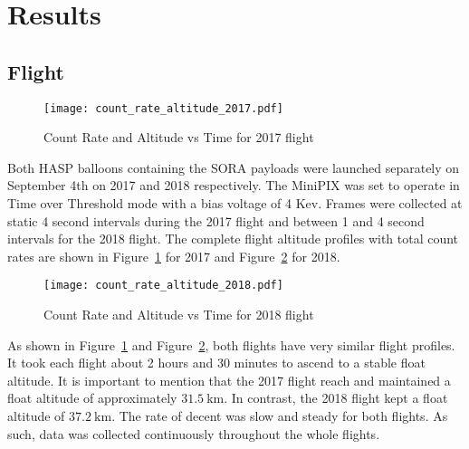 \section{Results}
\label{Results}

\subsection{Flight}

\begin{figure}[H]
\centering
\texttt{[image: count\_rate\_altitude\_2017.pdf]}
\caption{Count Rate and Altitude vs Time for 2017 flight}
\label{fig:ratealttime_2017}
\end{figure}
%

Both HASP balloons containing the SORA payloads were launched separately on September 4th on 2017 and 2018 respectively.  The MiniPIX was set to operate in Time over Threshold mode with a bias voltage of 4 Kev.  Frames were collected at static 4 second intervals during the 2017 flight and between 1 and 4 second intervals for the 2018 flight.  The complete flight altitude profiles with total count rates are shown in Figure~\ref{fig:ratealttime_2017} for 2017 and Figure~\ref{fig:ratealttime_2018} for 2018.
%
\begin{figure}[H]
\centering
\texttt{[image: count\_rate\_altitude\_2018.pdf]}
\caption{Count Rate and Altitude vs Time for 2018 flight}
\label{fig:ratealttime_2018}
\end{figure}
%
As shown in Figure~\ref{fig:ratealttime_2017} and Figure~\ref{fig:ratealttime_2018}, both flights have very similar flight profiles.  It took each flight about 2 hours and 30 minutes to ascend to a stable float altitude.  It is important to mention that the 2017 flight reach and maintained a float altitude of approximately $\SI{31.5}{\kilo\meter}$.  In contrast, the 2018 flight kept a float altitude of $\SI{37.2}{\kilo\meter}$.  The rate of decent was slow and steady for both flights.  As such, data was collected continuously throughout the whole flights.

